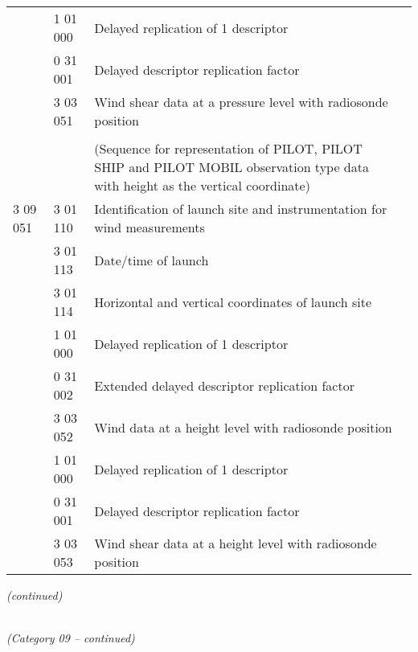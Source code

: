\begin{longtable}[]{@{}llll@{}}
& 1 01 000 & Delayed replication of 1 descriptor &\tabularnewline
& 0 31 001 & Delayed descriptor replication factor &\tabularnewline
& 3 03 051 & Wind shear data at a pressure level with radiosonde position &\tabularnewline
& & &\tabularnewline
& & (Sequence for representation of PILOT, PILOT SHIP and PILOT MOBIL observation type data with height as the vertical coordinate) &\tabularnewline
3 09 051 & 3 01 110 & Identification of launch site and instrumentation for wind measurements &\tabularnewline
& 3 01 113 & Date/time of launch &\tabularnewline
& 3 01 114 & Horizontal and vertical coordinates of launch site &\tabularnewline
& 1 01 000 & Delayed replication of 1 descriptor &\tabularnewline
& 0 31 002 & Extended delayed descriptor replication factor &\tabularnewline
& 3 03 052 & Wind data at a height level with radiosonde position &\tabularnewline
& 1 01 000 & Delayed replication of 1 descriptor &\tabularnewline
& 0 31 001 & Delayed descriptor replication factor &\tabularnewline
& 3 03 053 & Wind shear data at a height level with radiosonde position &\tabularnewline
\bottomrule
\end{longtable}

\emph{(continued)}

\emph{\\
(Category 09 -- continued)}

